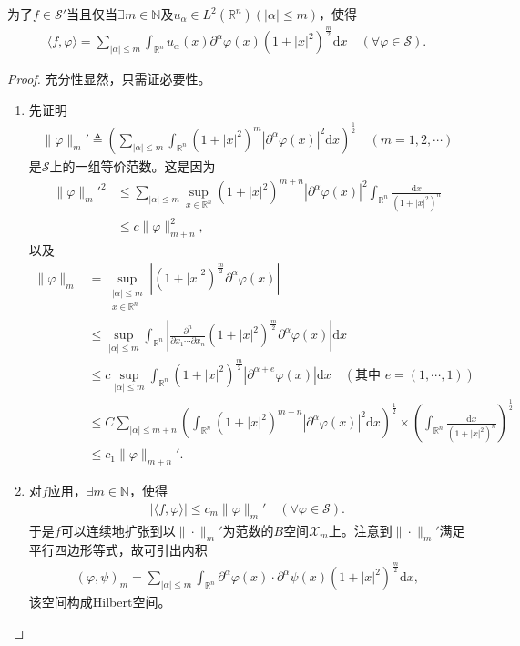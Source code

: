 \documentclass[../../main.tex]{subfiles}%
\begin{document}
\begin{theorem}
为了$f\in\mathscr{S}'$当且仅当$\exists m\in\mathbb{N}$及$u_\alpha\in L^2(\mathbb{R}^n)(|\alpha|\leqslant m)$，使得
\begin{align*}
\langle f,\varphi\rangle=\sum\limits_{|\alpha|\leqslant m}\int_{\mathbb{R}^n}u_\alpha(x)\partial^\alpha\varphi(x)(1+|x|^2)^{\frac{m}{2}}\mathrm{d}x\quad(\forall\varphi\in\mathscr{S}).
\end{align*}
\end{theorem}
\begin{proof}

充分性显然，只需证必要性。
\begin{enumerate}[(1)]
\item 先证明
\begin{align*}
\|\varphi\|_m'\triangleq\left(\sum\limits_{|\alpha|\leqslant m}\int_{\mathbb{R}^n}(1+|x|^2)^m|\partial^\alpha\varphi(x)|^2\mathrm{d}x\right)^{\frac{1}{2}}\quad(m=1,2,\cdots)
\end{align*}
是$\mathscr{S}$上的一组等价范数。这是因为
\begin{align*}
\|\varphi\|_m'^2&\leqslant\sum\limits_{|\alpha|\leqslant m}\sup\limits_{x\in\mathbb{R}^n}(1+|x|^2)^{m+n}|\partial^\alpha\varphi(x)|^2\int_{\mathbb{R}^n}\frac{\mathrm{d}x}{(1+|x|^2)^n}\\
&\leqslant c\|\varphi\|_{m+n}^2,
\end{align*}
以及
\begin{align*}
\|\varphi\|_m&=\sup\limits_{\substack{|\alpha|\leqslant m\\x\in\mathbb{R}^n}}\left|(1+|x|^2)^{\frac{m}{2}}\partial^\alpha\varphi(x)\right|\\
&\leqslant\sup\limits_{|\alpha|\leqslant m}\int_{\mathbb{R}^n}\left|\frac{\partial^n}{\partial x_1\cdots\partial x_n}(1+|x|^2)^{\frac{m}{2}}\partial^\alpha\varphi(x)\right|\mathrm{d}x\\
&\leqslant c\sup\limits_{|\alpha|\leqslant m}\int_{\mathbb{R}^n}(1+|x|^2)^{\frac{m}{2}}|\partial^{\alpha+e}\varphi(x)|\mathrm{d}x\quad(\text{其中 }e=(1,\cdots,1))\\
&\leqslant C\sum\limits_{|\alpha|\leqslant m+n}\left(\int_{\mathbb{R}^n}(1+|x|^2)^{m+n}|\partial^\alpha\varphi(x)|^2\mathrm{d}x\right)^{\frac{1}{2}}\times\left(\int_{\mathbb{R}^n}\frac{\mathrm{d}x}{(1+|x|^2)^n}\right)^{\frac{1}{2}}\\
&\leqslant c_1\|\varphi\|_{m+n}'.
\end{align*}

\item 对$f$应用，$\exists m\in\mathbb{N}$，使得
\begin{align}
|\langle f,\varphi\rangle|\leqslant c_m\|\varphi\|_m'\quad(\forall\varphi\in\mathscr{S}).\label{eq:4-2-6}
\end{align}
于是$f$可以连续地扩张到以$\|\cdot\|_m'$为范数的$B$空间$\mathscr{X}_m$上。注意到$\|\cdot\|_m'$满足平行四边形等式，故可引出内积
\begin{align*}
(\varphi,\psi)_m=\sum\limits_{|\alpha|\leqslant m}\int_{\mathbb{R}^n}\partial^\alpha\varphi(x)\cdot\partial^\alpha\psi(x)(1+|x|^2)^{\frac{m}{2}}\mathrm{d}x,
\end{align*}
该空间构成Hilbert空间。


\end{enumerate}
\end{proof}
\end{document}
